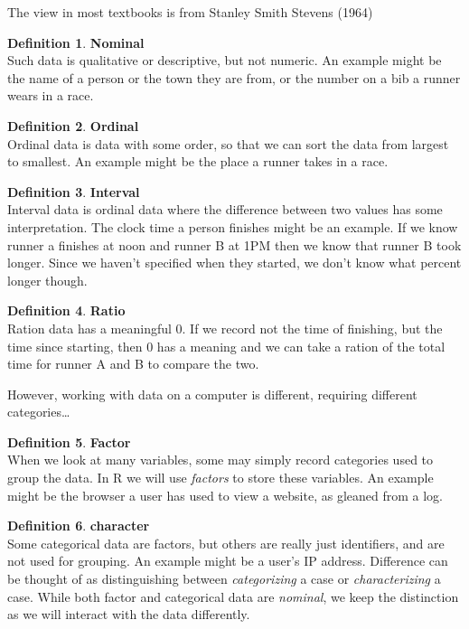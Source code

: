 \documentclass[
]{book}
\theoremstyle{definition}
\newtheorem{definition}{Definition}[chapter]
\theoremstyle{definition}
\theoremstyle{definition}
\theoremstyle{definition}
\theoremstyle{remark}
\begin{document}
The view in most textbooks is from Stanley Smith Stevens (1964)

\begin{definition}
\textbf{Nominal}\\
Such data is qualitative or descriptive, but not numeric. An example might be the name of a person or the town they are from, or the number on a bib a runner wears in a race.
\end{definition}

\begin{definition}
\textbf{Ordinal}\\
Ordinal data is data with some order, so that we can sort the data from largest to smallest. An example might be the place a runner takes in a race.
\end{definition}

\begin{definition}
\textbf{Interval}\\
Interval data is ordinal data where the difference between two values has some interpretation. The clock time a person finishes might be an example. If we know runner a finishes at noon and runner B at 1PM then we know that runner B took longer. Since we haven't specified when they started, we don't know what percent longer though.
\end{definition}

\begin{definition}
\textbf{Ratio}\\
Ration data has a meaningful 0. If we record not the time of finishing, but the time since starting, then 0 has a meaning and we can take a ration of the total time for runner A and B to compare the two.
\end{definition}

However, working with data on a computer is different, requiring different categories\ldots{}

\begin{definition}
\textbf{Factor}\\
When we look at many variables, some may simply record categories used to group the data. In R we will use \emph{factors} to store these variables. An example might be the browser a user has used to view a website, as gleaned from a log.
\end{definition}

\begin{definition}
\textbf{character}\\
Some categorical data are factors, but others are really just identifiers, and are not used for grouping. An example might be a user's IP address. Difference can be thought of as distinguishing between \emph{categorizing} a case or \emph{characterizing} a case. While both factor and categorical data are \emph{nominal}, we keep the distinction as we will interact with the data differently.
\end{definition}
\end{document}
